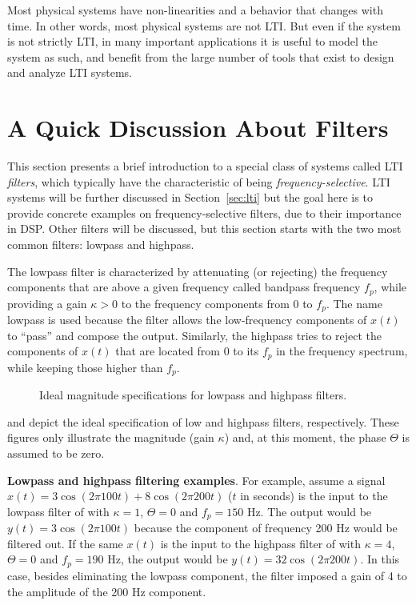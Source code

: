 Most physical systems have non-linearities and a behavior that changes with time. In other words, most physical systems are not LTI. But even if the system is not strictly LTI, in many important applications it is useful to model the system as such, and benefit from the large number of tools that exist to design and analyze LTI systems.


\section{A Quick Discussion About Filters}

This section presents a brief introduction to a special class of systems called LTI \emph{filters}, which typically have the characteristic of being \emph{frequency-selective}. LTI systems will be further discussed in Section~\ref{sec:lti} but the goal here is to provide concrete examples on frequency-selective filters, due to their importance in DSP. Other filters will be discussed, but this section starts with the two most common filters: lowpass and highpass.

The lowpass filter is characterized by attenuating (or rejecting) the frequency components that are above a given frequency called bandpass frequency $f_p$, while providing a gain $\kappa > 0$ to the frequency components from 0 to $f_p$. The name lowpass is used because the filter allows the low-frequency components of $x(t)$ to ``pass'' and compose the output. Similarly, the highpass tries to reject the components of $x(t)$ that are located from 0 to its $f_p$ in the frequency spectrum, while keeping those higher than $f_p$.

\begin{figure}[htb]
\centering
  \caption{Ideal magnitude specifications for lowpass and highpass filters.}
  \label{fig:low_highpass_specs}
\end{figure}

 and  depict the ideal specification of low and highpass filters, respectively. These figures only illustrate the magnitude (gain $\kappa$) and, at this moment, the phase $\Theta$ is assumed to be zero. 

\bExample \textbf{Lowpass and highpass filtering examples}.
For example, assume a signal $x(t) = 3 \cos(2 \pi 100 t) + 8 \cos(2 \pi 200 t)$ ($t$ in seconds) is the input to the lowpass filter of  with $\kappa=1$, $\Theta=0$ and $f_p = 150$ Hz. The output would be $y(t)=3 \cos(2 \pi 100 t)$ because the component of frequency 200 Hz would be filtered out. If the same $x(t)$ is the input to the highpass filter of  with $\kappa=4$, $\Theta=0$ and $f_p = 190$ Hz, the output would be $y(t)=32 \cos(2 \pi 200 t)$. In this case, besides eliminating the lowpass component, the filter imposed a gain of 4 to the amplitude of the 200 Hz component.
\eExample 

